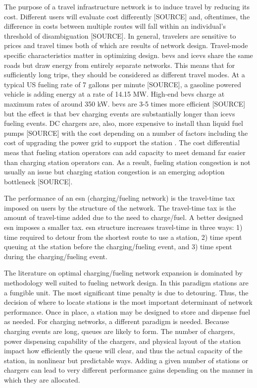 The purpose of a travel infrastructure network is to induce travel by reducing its cost. Different users will evaluate cost differently [SOURCE] and, oftentimes, the difference in costs between multiple routes will fall within an individual's threshold of disambiguation [SOURCE]. In general, travelers are sensitive to prices and travel times both of which are results of network design. Travel-mode specific characteristics matter in optimizing design. \glspl{bev} and \glspl{icev} share the same roads but draw energy from entirely separate networks. This means that for sufficiently long trips, they should be considered as different travel modes. At a typical US fueling rate of 7 gallons per minute [SOURCE], a gasoline powered vehicle is adding energy at a rate of 14.15 MW. High-end \glspl{bev} charge at maximum rates of around 350 kW. \glspl{bev} are 3-5 times more efficient [SOURCE] but the effect is that \gls{bev} charging events are substantially longer than \glspl{icev} fueling events. DC chargers are, also, more expensive to install than liquid fuel pumps [SOURCE] with the cost depending on a number of factors including the cost of upgrading the power grid to support the station \cite{Gamage_2023}. The cost differential meas that fueling station operators can add capacity to meet demand far easier than charging station operators can. As a result, fueling station congestion is not usually an issue but charging station congestion is an emerging adoption bottleneck [SOURCE].

The performance of an \gls{esn} (charging/fueling network) is the travel-time tax imposed on users by the structure of the network. The travel-time tax is the amount of travel-time added due to the need to charge/fuel. A better designed \gls{esn} imposes a smaller tax. \gls{esn} structure increases travel-time in three ways: 1) time required to detour from the shortest route to use a station, 2) time spent queuing at the station before the charging/fueling event, and 3) time spent during the charging/fueling event.

The literature on optimal charging/fueling network expansion is dominated by methodology well suited to fueling network design. In this paradigm stations are a fungible unit. The most significant time penalty is due to detouring. Thus, the decision of where to locate stations is the most important determinant of network performance. Once in place, a station may be designed to store and dispense fuel as needed. For charging networks, a different paradigm is needed. Because charging events are long, queues are likely to form. The number of chargers, power dispensing capability of the chargers, and physical layout of the station impact how efficiently the queue will clear, and thus the actual capacity of the station, in nonlinear but predictable ways. Adding a given number of stations or chargers can lead to very different performance gains depending on the manner in which they are allocated.

